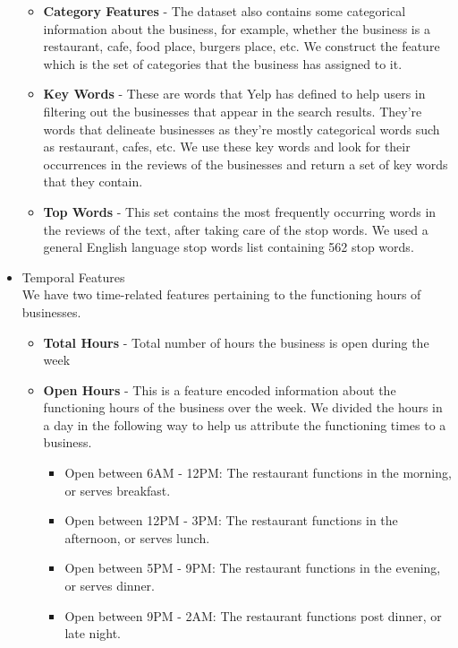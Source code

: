 \documentclass{article}
\begin{document}
\begin{itemize}
\begin{itemize}
            \item
               \textbf{Category Features} - The dataset also contains some categorical information about the business, for example, whether the business is a restaurant, cafe, food place, burgers place, etc.
               We construct the feature which is the set of categories that the business has assigned to it. 

            \item
               \textbf{Key Words} - These are words that Yelp has defined to help users in filtering out the businesses that appear in the search results.
               They're words that delineate businesses as they're mostly categorical words such as restaurant, cafes, etc.
               We use these key words and look for their occurrences in the reviews of the businesses and return a set of key words that they contain.

            \item
               \textbf{Top Words} - This set contains the most frequently occurring words in the reviews of the text, after taking care of the stop words.
               We used a general English language stop words list containing 562 stop words.
         \end{itemize}

      \item Temporal Features \\
         We have two time-related features pertaining to the functioning hours of businesses.
         \begin{itemize}
            \item
               \textbf{Total Hours} - Total number of hours the business is open during the week
            \item
               \textbf{Open Hours} - This is a feature encoded information about the functioning hours of the business over the week.
               We divided the hours in a day in the following way to help us attribute the functioning times to a business.

               \begin{itemize}
                  \item Open between 6AM - 12PM: The restaurant functions in the morning, or serves breakfast.
                  \item Open between 12PM - 3PM: The restaurant functions in the afternoon, or serves lunch.
                  \item Open between 5PM - 9PM: The restaurant functions in the evening, or serves dinner.
                  \item Open between 9PM - 2AM: The restaurant functions post dinner, or late night.
               \end{itemize}


\end{itemize}
\end{itemize}
\end{document}

